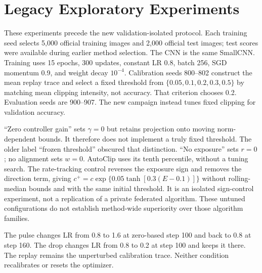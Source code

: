 \documentclass{article}
\begin{document}
\section{Legacy Exploratory Experiments}
\label{app:legacy}
These experiments precede the new validation-isolated protocol. Each training
seed selects 5,000 official training images and 2,000 official test images;
test scores were available during earlier method selection. The CNN is the
same SmallCNN. Training uses 15 epochs, 300 updates, constant LR 0.8, batch
256, SGD momentum 0.9, and weight decay $10^{-4}$. Calibration seeds 800--802
construct the mean replay trace and select a fixed threshold from
$\{0.05,0.1,0.2,0.3,0.5\}$ by matching mean clipping intensity, not accuracy.
That criterion chooses 0.2. Evaluation seeds are 900--907. The new campaign
instead tunes fixed clipping for validation accuracy.

\begin{table}[htbp]
\centering\small
\caption{Legacy mechanism controls, eight paired seeds. All intervals are
recomputed Student-$t$ 95\% intervals, replacing the original normal
approximation. $\Delta$ is DAGC minus the listed control, in percentage points.}

\end{table}

\newpage
``Zero controller gain'' sets $\gamma=0$ but retains projection onto moving
norm-dependent bounds. It therefore does not implement a truly fixed
threshold. The older label ``frozen threshold'' obscured that distinction.
``No exposure'' sets $r=0$; no alignment sets $w=0$. AutoClip uses its tenth
percentile, without a tuning search. The rate-tracking control reverses the
exposure sign and removes the direction term, giving
$c^+=c\exp\{0.05\tanh[0.3(E-0.1)]\}$ without rolling-median bounds and with the same initial
threshold. It is an isolated sign-control experiment, not a replication of a
private federated algorithm. These untuned configurations do not establish
method-wide superiority over those algorithm families.

\begin{table}[htbp]
\centering\small
\caption{Legacy learning-rate perturbations, eight paired seeds 1000--1007.
DAGC-minus-control accuracy differences in percentage points.}

\end{table}

The pulse changes LR from 0.8 to 1.6 at zero-based step 100 and back to 0.8
at step 160. The drop changes LR from 0.8 to 0.2 at step 100 and keeps it
there. The replay remains the unperturbed calibration trace. Neither condition
recalibrates or resets the optimizer.
\end{document}
